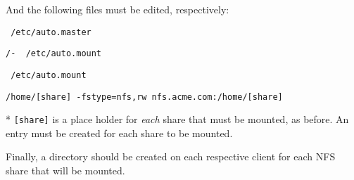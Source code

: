 \noindent
And the following files must be edited, respectively: \\

\begin{lstlisting}
 /etc/auto.master
\end{lstlisting}
\vspace{1em}

\begin{lstlisting}[backgroundcolor=\color{Gray}]
 /-  /etc/auto.mount
\end{lstlisting}
\vspace{1em}

\begin{lstlisting}
 /etc/auto.mount
\end{lstlisting}
\vspace{1em}

\begin{lstlisting}[backgroundcolor=\color{Gray}]
 /home/[share] -fstype=nfs,rw nfs.acme.com:/home/[share]
\end{lstlisting}
* \lstinline$[share]$ is a place holder for \textit{each} share that must be 
mounted, as before. An entry must be created for each share to be mounted.
\vspace{2em}

\noindent
Finally, a directory should be created on each respective client for each NFS
share that will be mounted. \\
